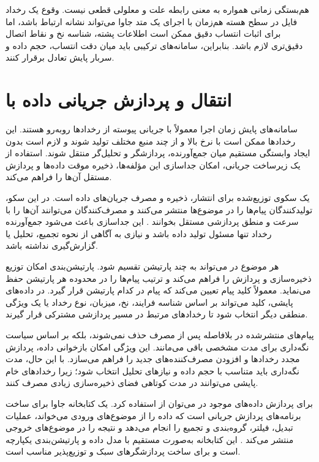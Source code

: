 هم‌بستگی زمانی همواره به معنی رابطه علت و معلولی قطعی نیست. وقوع یک رخداد فایل
در سطح هسته هم‌زمان با اجرای یک متد جاوا می‌تواند نشانه ارتباط باشد، اما برای
اثبات انتساب دقیق ممکن است اطلاعات پشته، شناسه نخ و نقاط اتصال دقیق‌تری لازم
باشد. بنابراین، سامانه‌های ترکیبی باید میان دقت انتساب، حجم داده و سربار پایش
تعادل برقرار کنند.

\section{انتقال و پردازش جریانی داده با }
\label{sec:kafka-stream-processing}

سامانه‌های پایش زمان اجرا معمولاً با جریانی پیوسته از رخدادها روبه‌رو هستند.
این رخدادها ممکن است با نرخ بالا و از چند منبع مختلف تولید شوند و لازم است
بدون ایجاد وابستگی مستقیم میان جمع‌آورنده، پردازشگر و تحلیل‌گر منتقل شوند.
استفاده از یک زیرساخت جریانی، امکان جداسازی این مؤلفه‌ها، ذخیره موقت داده‌ها و
پردازش مستقل آن‌ها را فراهم می‌کند.

 یک سکوی توزیع‌شده برای انتشار، ذخیره و مصرف جریان‌های داده
است. در این سکو، تولیدکنندگان پیام‌ها را در موضوع‌ها%
منتشر می‌کنند و مصرف‌کنندگان می‌توانند آن‌ها را با سرعت و منطق پردازشی مستقل
بخوانند \cite{kafkadocs}. این جداسازی باعث می‌شود جمع‌آورنده رخداد تنها مسئول
تولید داده باشد و نیازی به آگاهی از نحوه تجمیع، تحلیل یا گزارش‌گیری نداشته باشد.

هر موضوع در  می‌تواند به چند پارتیشن تقسیم شود. پارتیشن‌بندی امکان
توزیع ذخیره‌سازی و پردازش را فراهم می‌کند و ترتیب پیام‌ها را در محدوده هر
پارتیشن حفظ می‌نماید. معمولاً کلید پیام تعیین می‌کند که پیام در کدام پارتیشن
قرار گیرد. در داده‌های پایشی، کلید می‌تواند بر اساس شناسه فرایند، نخ، میزبان،
نوع رخداد یا یک ویژگی منطقی دیگر انتخاب شود تا رخدادهای مرتبط در مسیر پردازشی
مشترکی قرار گیرند.

پیام‌های منتشرشده در  بلافاصله پس از مصرف حذف نمی‌شوند، بلکه بر اساس
سیاست نگه‌داری برای مدت مشخصی باقی می‌مانند. این ویژگی امکان بازخوانی داده،
پردازش مجدد رخدادها و افزودن مصرف‌کننده‌های جدید را فراهم می‌سازد. با این حال،
مدت نگه‌داری باید متناسب با حجم داده و نیازهای تحلیل انتخاب شود؛ زیرا رخدادهای
خام پایشی می‌توانند در مدت کوتاهی فضای ذخیره‌سازی زیادی مصرف کنند.

برای پردازش داده‌های موجود در  می‌توان از  استفاده
کرد.  یک کتابخانه جاوا برای ساخت برنامه‌های پردازش جریانی
است که داده را از موضوع‌های ورودی می‌خواند، عملیات تبدیل، فیلتر، گروه‌بندی و
تجمیع را انجام می‌دهد و نتیجه را در موضوع‌های خروجی منتشر می‌کند
\cite{kafkastreams}. این کتابخانه به‌صورت مستقیم با مدل داده و پارتیشن‌بندی
 یکپارچه است و برای ساخت پردازشگرهای سبک و توزیع‌پذیر مناسب است.

